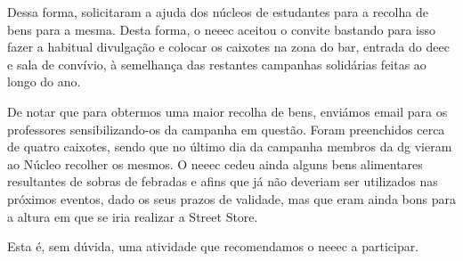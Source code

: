 Dessa forma, solicitaram a ajuda dos núcleos de estudantes para a recolha de bens para a mesma. Desta forma, o \acrshort{neeec} aceitou o convite bastando para isso fazer a habitual divulgação e colocar os caixotes na zona do bar, entrada do \acrshort{deec} e sala de convívio, à semelhança das restantes campanhas solidárias feitas ao longo do ano.

De notar que para obtermos uma maior recolha de bens, enviámos email para os professores sensibilizando-os da campanha em questão. Foram preenchidos cerca de quatro caixotes, sendo que no último dia da campanha membros da \acrshort{dg} vieram ao Núcleo recolher os mesmos. O \acrshort{neeec} cedeu ainda alguns bens alimentares resultantes de sobras de febradas e afins que já não deveriam ser utilizados nas próximos eventos, dado os seus prazos de validade, mas que eram ainda bons para a altura em que se iria realizar a Street Store.

Esta é, sem dúvida, uma atividade que recomendamos o \acrshort{neeec} a participar.
